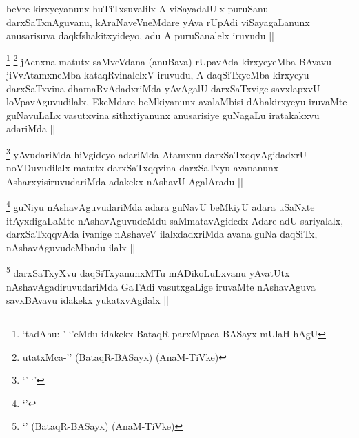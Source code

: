 
\begin{artha}
beVre kirxyeyanunx huTiTxsuvalilx A viSayadalUlx puruSanu darxSaTxnAguvanu, kAraNaveVneMdare yAva rUpAdi viSayagaLanunx anusarisuva daqkfshakitxyideyo, adu A puruSanalelx iruvudu ||
\end{artha}



\begin{artha}
\footnote{`tadAhu:-' `\stext'eMdu idakekx BataqR parxMpaca BASayx mUlaH hAgU}
\footnote{utatxMca-'\stext' (BataqR-BASayx) (AnaM-TiVke)}
jAcnxna matutx saMveVdana (anuBava) rUpavAda kirxyeyeMba BAvavu jiVvAtamxneMba kataqRvinalelxV iruvudu, A daqSiTxyeMba kirxyeyu darxSaTxvina dhamaRvAdadxriMda yAvAgalU darxSaTxvige savxlapxvU loVpavAguvudilalx, EkeMdare beMkiyanunx avalaMbisi dAhakirxyeyu iruvaMte guNavuLaLx vasutxvina sithxtiyanunx anusarisiye guNagaLu iratakakxvu adariMda ||
\end{artha}

\begin{artha}
\footnote{`\stext' `\stext'}
yAvudariMda hiVgideyo adariMda Atamxnu darxSaTxqqvAgidadxrU noVDuvudilalx matutx darxSaTxqqvina darxSaTxyu avananunx AsharxyisiruvudariMda adakekx nAshavU AgalAradu ||
\end{artha}


\begin{artha}
\footnote{`\stext'}
guNiyu nAshavAguvudariMda adara guNavU beMkiyU adara uSaNxte itAyxdigaLaMte nAshavAguvudeMdu saMmatavAgidedx Adare adU sariyalalx, darxSaTxqqvAda ivanige nAshaveV ilalxdadxriMda avana guNa daqSiTx, nAshavAguvudeMbudu ilalx ||
\end{artha}



\begin{artha}
\footnote{`\stext' (BataqR-BASayx) (AnaM-TiVke)}
darxSaTxyXvu daqSiTxyanunxMTu mADikoLuLxvanu yAvatUtx nAshavAgadiruvudariMda GaTAdi vasutxgaLige iruvaMte nAshavAguva savxBAvavu idakekx yukatxvAgilalx ||
\end{artha}

